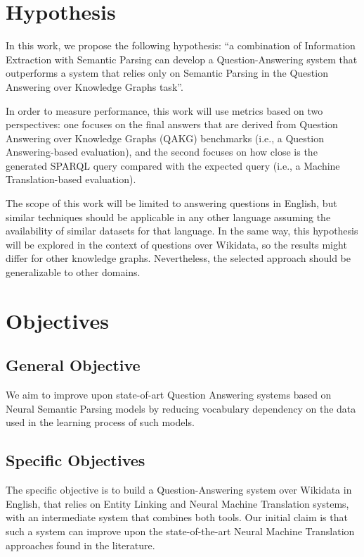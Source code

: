 \section*{Hypothesis}
In this work, we propose the following hypothesis: “a combination of Information 
Extraction with Semantic Parsing can develop a Question-Answering system that outperforms 
a system that relies only on Semantic Parsing in the Question Answering over Knowledge 
Graphs task”.

In order to measure performance, this work will use metrics based on two perspectives: 
one focuses on the final answers that are derived from Question Answering over Knowledge 
Graphs (QAKG) benchmarks (i.e., a Question Answering-based evaluation), and the second 
focuses on how close is the generated SPARQL query compared with the expected query (i.e., 
a Machine Translation-based evaluation).

The scope of this work will be limited to answering questions in English, but similar 
techniques should be applicable in any other language assuming the availability of similar 
datasets for that language. In the same way, this hypothesis will be explored in the context of 
questions over Wikidata, so the results might differ for other knowledge graphs. Nevertheless, 
the selected approach should be generalizable to other domains. 

\section*{Objectives}
\subsection*{General Objective}
We aim to improve upon state-of-art Question Answering systems 
based on Neural Semantic Parsing models by reducing vocabulary dependency on the 
data used in the learning process of such models.
\subsection*{Specific Objectives}
The specific objective is to build a Question-Answering system over Wikidata in English, 
that relies on Entity Linking and Neural Machine Translation systems, with an intermediate 
system that combines both tools. Our initial claim is that such a system can improve upon 
the state-of-the-art Neural Machine Translation approaches found in the literature.  

